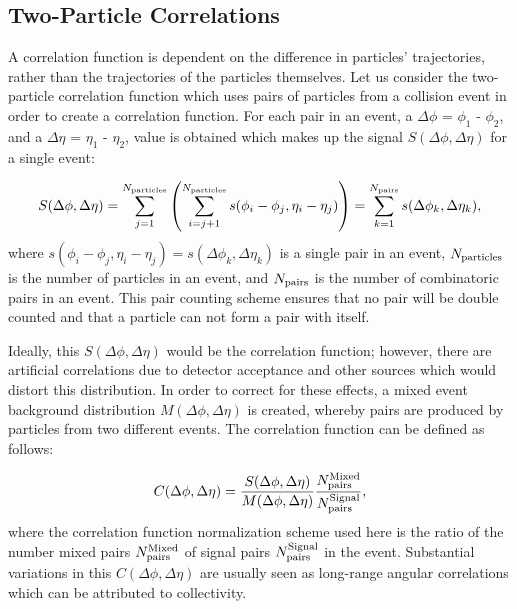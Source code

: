 \subsection{Two-Particle Correlations}
A correlation function is dependent on the difference in particles' trajectories, rather than the trajectories of the particles themselves. Let us consider the two-particle correlation function which uses pairs of particles from a collision event in order to create a correlation function. For each pair in an event, a $\Delta\phi$ = $\phi_1$ - $\phi_2$, and a $\Delta\eta$ = $\eta_1$ - $\eta_2$, value is obtained which makes up the signal $S(\Delta\phi,\Delta\eta)$ for a single event: 

\begin{equation}
  S(\Delta\phi,\Delta\eta) = \sum_{j=1}^{N_{\rm particles}}\left(\sum_{i=j+1}^{N_{\rm particles}}s(\phi_i - \phi_j,\eta_i - \eta_j)\right)=\sum_{k=1}^{N_{\rm pairs}}s(\Delta\phi_k,\Delta\eta_k),
\end{equation}
where $s(\phi_i - \phi_j,\eta_i - \eta_j) = s(\Delta\phi_k,\Delta\eta_k)$ is a single pair in an event, $N_{\rm particles}$ is the number of particles in an event, and $N_{\rm pairs}$ is the number of combinatoric pairs in an event. This pair counting scheme ensures that no pair will be double counted and that a particle can not form a pair with itself.

Ideally, this $S(\Delta\phi,\Delta\eta)$ would be the correlation function; however, there are artificial correlations due to detector acceptance and other sources which would distort this distribution. In order to correct for these effects, a mixed event background distribution $M(\Delta\phi,\Delta\eta)$ is created, whereby pairs are produced by particles from two different events. The correlation function can be defined as follows:

\begin{equation}
  C(\Delta\phi,\Delta\eta) =
          \frac{S(\Delta\phi,\Delta\eta)}{M(\Delta\phi,\Delta\eta)} 
          \frac{N_{\rm pairs}^{\rm Mixed}}{N_{\rm pairs}^{\rm Signal}},
  \label{eq:def_corr_function}
\end{equation}
where the correlation function normalization scheme used here is the ratio of the number mixed pairs $N_{\rm pairs}^{\rm Mixed}$ of signal pairs $N_{\rm pairs}^{\rm Signal}$ in the event. Substantial variations in this $C(\Delta\phi,\Delta\eta)$ are usually seen as long-range angular correlations which can be attributed to collectivity.

